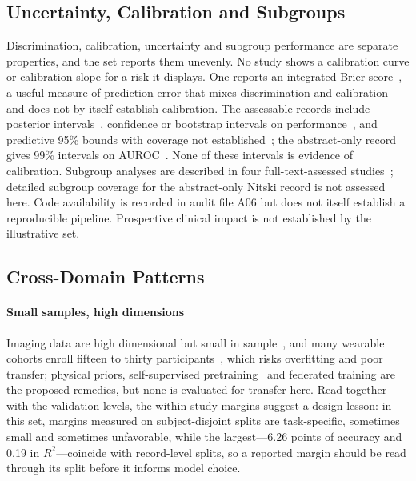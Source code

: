 \documentclass[journal]{IEEEtran}
\begin{document}
\subsection{Uncertainty, Calibration and Subgroups}
Discrimination, calibration, uncertainty and subgroup performance are separate properties, and the set reports them unevenly. No study shows a calibration curve or calibration slope for a risk it displays. One reports an integrated Brier score~\cite{lin2022deep}, a useful measure of prediction error that mixes discrimination and calibration and does not by itself establish calibration. The assessable records include posterior intervals~\cite{XiaoLi2016DiabetesSpatiotemporal}, confidence or bootstrap intervals on performance~\cite{lin2022deep,glaser2022deep}, and predictive 95\% bounds with coverage not established~\cite{Li2020GluNet}; the abstract-only record gives 99\% intervals on AUROC~\cite{nitski2021long}. None of these intervals is evidence of calibration. Subgroup analyses are described in four full-text-assessed studies~\cite{glaser2022deep,liu2024cignn,herath2026parkinson,chan2026sitstand}; detailed subgroup coverage for the abstract-only Nitski record is not assessed here. Code availability is recorded in audit file A06 but does not itself establish a reproducible pipeline. Prospective clinical impact is not established by the illustrative set.

\subsection{Cross-Domain Patterns}
\label{sec:patterns}
\paragraph{Small samples, high dimensions} Imaging data are high dimensional but small in sample~\cite{4,5,6}, and many wearable cohorts enroll fifteen to thirty participants~\cite{verbiest2023gaitstride,liu2025sleepposture,wang2025vo2}, which risks overfitting and poor transfer; physical priors, self-supervised pretraining~\cite{herath2026parkinson} and federated training are the proposed remedies, but none is evaluated for transfer here. Read together with the validation levels, the within-study margins suggest a design lesson: in this set, margins measured on subject-disjoint splits are task-specific, sometimes small and sometimes unfavorable, while the largest---6.26 points of accuracy and 0.19 in $R^2$---coincide with record-level splits, so a reported margin should be read through its split before it informs model choice.
\end{document}
